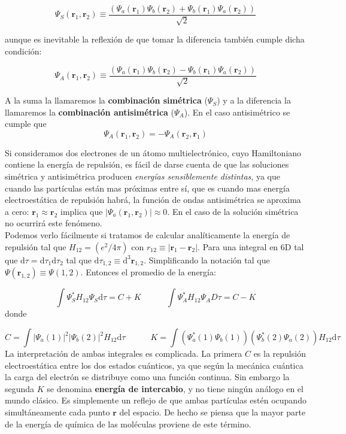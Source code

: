 \documentclass[12pt]{article}
\newcommand{\D}{\mathrm{d}}
\newcommand{\tquad}{\quad \quad \quad}
\newcommand{\rn}{\mathbf{r}}
\begin{document}
\begin{equation}
\Psi_S (\rn_1 , \rn_2) \equiv \dfrac{(\Psi_a (\rn_1) \Psi_b (\rn_2)+\Psi_b (\rn_1) \Psi_a (\rn_2))}{\sqrt{2}}
\end{equation}

aunque es inevitable la reflexión de que tomar la diferencia también cumple dicha condición:

\begin{equation}
\Psi_A (\rn_1 , \rn_2) \equiv \dfrac{(\Psi_a (\rn_1) \Psi_b (\rn_2)-\Psi_b (\rn_1) \Psi_a (\rn_2))}{\sqrt{2}}
\end{equation}

A la suma la llamaremos la \textbf{combinación simétrica} ($\Psi_S$) y a la diferencia la llamaremos la  \textbf{combinación antisimétrica} ($\Psi_A$). En el caso antisimétrico se cumple que  
\begin{equation}
\Psi_A (\rn_1,\rn_2)  = - \Psi_A (\rn_2,\rn_1) 
\end{equation} 

Si consideramos dos electrones de un átomo multielectrónico, cuyo Hamiltoniano contiene la energía de repulsión, es fácil de darse cuenta de que las soluciones simétrica y antisimétrica producen \textit{energías sensiblemente distintas}, ya que cuando las partículas están mas próximas entre sí, que es cuando mas energía electroestática de repulsión habrá, la función de ondas antisimétrica se aproxima a cero: $\rn_1 \approx \rn_2$ implica que $| \Psi_a (\rn_1,\rn_2) | \approx 0$. En el caso de la solución simétrica no ocurrirá este fenómeno. \\

Podemos verlo fácilmente si tratamos de calcular analíticamente la energía de repulsión tal que $H_{12} = (e^2 / 4 \pi)$ con $r_{12} \equiv | \rn_1 - \rn_2 |$. Para una integral en 6D tal que $\D \tau = \D \tau_1 \D \tau_2$ tal que $\D \tau_{1,2} \equiv \D^3 \rn_{1,2}$. Simplificando la notación tal que $\Psi (\rn_{1,2}) \equiv \Psi (1,2)$. Entonces el promedio de la energía:

\begin{equation}
\int \Psi_S^* H_{12} \Psi_S  \D \tau = C+K \tquad \int \Psi_A^* H_{12} \Psi_A D \tau = C-K
\end{equation}
donde

\begin{equation}
C = \int |\Psi_a (1)|^2 |\Psi_b (2)|^2 H_{12} \D \tau \tquad 
K = \int (\Psi^*_a (1) \Psi_b(1)) (\Psi^*_b (2) \Psi_a (2)) H_{12} \D \tau  
\end{equation}
La interpretación de ambas integrales es complicada. La primera $C$ es la repulsión electroestática entre los dos estados cuánticos, ya que según la mecánica cuántica la carga del electrón se distribuye como una función continua. Sin embargo la segunda $K$ se denomina \textbf{energía de intercabio}, y no tiene ningún análogo en el mundo clásico. Es simplemente un reflejo de que ambas partículas estén ocupando simultáneamente cada punto $\rn$ del espacio. De hecho se piensa que la mayor parte de la energía de química de las moléculas proviene de este término. \\
 
\end{document}
